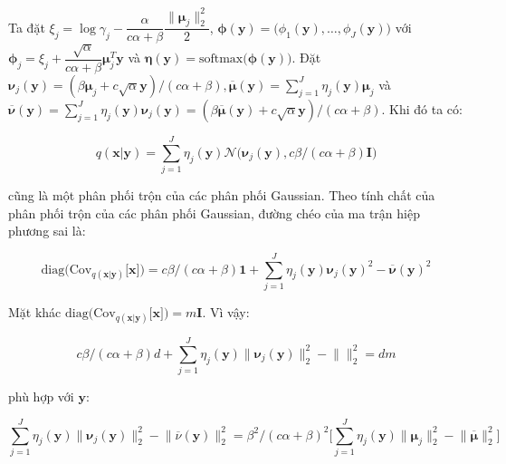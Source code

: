\documentclass[14pt, a4paper]{article}
\numberwithin{equation}{section}
\numberwithin{figure}{section}
\numberwithin{dl}{section}
\numberwithin{md}{section}
\numberwithin{bd}{section}
\numberwithin{dn}{section}
\numberwithin{hq}{section}
\begin{document}
    Ta đặt $\xi_j = \log \gamma_j - \dfrac{\alpha}{c \alpha + \beta}\dfrac{\lVert \boldsymbol{\mu}_j \rVert_2^2}{2}$, $\boldsymbol{\phi} (\boldsymbol{y})=\big ( \phi_1 (\boldsymbol{y}), \dots, \phi_J (\boldsymbol{y}) \big )$ với $\boldsymbol{\phi}_j = \xi_j + \dfrac{\sqrt{\alpha}}{c \alpha + \beta} \boldsymbol{\mu}_j^T \boldsymbol{y}$ và $\boldsymbol{\eta} (\boldsymbol{y})=\mathrm{softmax} \big ( \boldsymbol{\phi} (\boldsymbol{y}) \big )$.
    Đặt $\boldsymbol{\nu}_j (\boldsymbol{y})=(\beta \boldsymbol{\mu}_j + c \sqrt{\alpha} \boldsymbol{y})/(c \alpha + \beta), \overline{\boldsymbol{\mu}}(\boldsymbol{y})=\sum_{j=1}^J \eta_j (\boldsymbol{y}) \boldsymbol{\mu}_j$ và $\overline{\boldsymbol{\nu}} (\boldsymbol{y})=\sum_{j=1}^J \eta_j (\boldsymbol{y}) \boldsymbol{\nu}_j (\boldsymbol{y})=(\beta \overline{\boldsymbol{\mu}} (\boldsymbol{y}) + c \sqrt{\alpha} \boldsymbol{y})/(c \alpha + \beta)$.
    Khi đó ta có:

    \begin{equation}
        q(\boldsymbol{x} \vert \boldsymbol{y}) = \sum_{j=1}^J \eta_j (\boldsymbol{y}) \mathcal{N} \big ( \boldsymbol{\nu}_j (\boldsymbol{y}), c \beta / (c \alpha + \beta) \boldsymbol{I} \big )
    \end{equation}

    cũng là một phân phối trộn của các phân phối Gaussian.
    Theo tính chất của phân phối trộn của các phân phối Gaussian, đường chéo của ma trận hiệp phương sai là:

    \begin{equation}
        \mathrm{diag} \big( \mathrm{Cov}_{q(\boldsymbol{x} \vert \boldsymbol{y})} \lbrack \boldsymbol{x} \rbrack \big) = c \beta / (c \alpha + \beta) \boldsymbol{1} + \sum_{j=1}^J \eta_j (\boldsymbol{y}) \boldsymbol{\nu}_j (\boldsymbol{y})^2 - \overline{\boldsymbol{\nu}} (\boldsymbol{y})^2
    \end{equation}

    Mặt khác $\mathrm{diag} \big( \mathrm{Cov}_{q(\boldsymbol{x} \vert \boldsymbol{y})} \lbrack \boldsymbol{x} \rbrack \big)=m \boldsymbol{I}$.
    Vì vậy:

    \begin{equation}
        c \beta / (c \alpha + \beta)d + \sum_{j=1}^J \eta_j(\boldsymbol{y}) \lVert \boldsymbol{\nu}_j (\boldsymbol{y}) \rVert_2^2 - \lVert \rVert_2^2 = d m
    \end{equation}

    phù hợp với $\boldsymbol{y}$:

    \begin{equation}
        \sum_{j=1}^J \eta_j (\boldsymbol{y}) \lVert \boldsymbol{\nu}_j (\boldsymbol{y}) \rVert_2^2 - \lVert \overline{\nu} (\boldsymbol{y}) \rVert_2^2 = \beta^2 / (c \alpha + \beta)^2 \Bigg \lbrack \sum_{j=1}^J \eta_j (\boldsymbol{y}) \lVert \boldsymbol{\mu}_j \rVert_2^2 - \lVert \overline{\boldsymbol{\mu}} \rVert_2^2 \Bigg \rbrack
    \end{equation}
\end{document}
